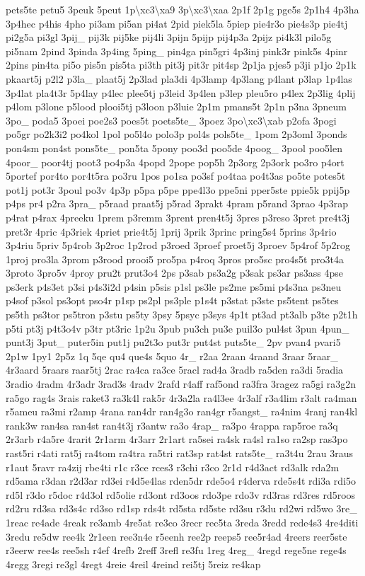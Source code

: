 {pets5te petu5 3peuk 5peut 1p\textbackslash{}xc3\textbackslash{}xa9 3p\textbackslash{}xc3\textbackslash{}xaa 2p1f 2p1g pge5s 2p1h4 4p3ha 3p4hec p4his 4pho pi3am pi5an pi4at 2pid piek5la 5piep pie4r3o pie4s3p pie4tj pi2g5a pi3gl 3pij\-\_\- pij3k pij5ke pij4li 3pijn 5pijp pij4p3a 2pijz pi4k3l pilo5g pi5nam 2pind 3pinda 3p4ing 5ping\-\_\- pin4ga pin5gri 4p3inj pink3r pink5s 4pinr 2pins pin4ta pi5o pis5n pis5ta pi3th pit3j pit3r pit4sp 2p1ja pjes5 p3ji p1jo 2p1k pkaart5j p2l2 p3la\-\_\- plaat5j 2p3lad pla3di 4p3lamp 4p3lang p4lant p3lap 1p4las 3p4lat pla4t3r 5p4lay p4lec plee5tj p3leid 3p4len p3lep pleu5ro p4lex 2p3lig 4plij p4lom p3lone p5lood plooi5tj p3loon p3luie 2p1m pmans5t 2p1n p3na 3pneum 3po\-\_\- poda5 3poei poe2s3 poes5t poets5te\-\_\- 3poez 3po\textbackslash{}xc3\textbackslash{}xab p2ofa 3pogi po5gr po2k3i2 po4kol 1pol po5l4o polo3p pol4s pols5te\-\_\- 1pom 2p3oml 3ponds pon4sm pon4st pons5te\-\_\- pon5ta 5pony poo3d poo5de 4poog\-\_\- 3pool poo5len 4poor\-\_\- poor4tj poot3 po4p3a 4popd 2pope pop5h 2p3org 2p3ork po3ro p4ort 5portef por4to por4t5ra po3ru 1pos po1sa po3sf po4taa po4t3as po5te potes5t pot1j pot3r 3poul po3v 4p3p p5pa p5pe ppe4l3o ppe5ni pper5ste ppie5k ppij5p p4ps pr4 p2ra 3pra\-\_\- p5raad praat5j p5rad 3prakt 4pram p5rand 3prao 4p3rap p4rat p4rax 4preeku 1prem p3remm 3prent pren4t5j 3pres p3reso 3pret pre4t3j pret3r 4pric 4p3riek 4priet prie4t5j 1prij 3prik 3princ pring5s4 5prins 3p4rio 3p4riu 5priv 5p4rob 3p2roc 1p2rod p3roed 3proef proet5j 3proev 5p4rof 5p2rog 1proj pro3la 3prom p3rood prooi5 pro5pa p4roq 3pros pro5sc pro4s5t pro3t4a 3proto 3pro5v 4proy pru2t prut3o4 2ps p3sab ps3a2g p3sak ps3ar ps3ass 4pse ps3erk p4s3et p3si p4s3i2d p4sin p5sis p1sl ps3le ps2me ps5mi p4s3na ps3neu p4sof p3sol ps3opt pso4r p1sp ps2pl ps3ple p1s4t p3stat p3ste ps5tent ps5tes ps5th ps3tor ps5tron p3stu ps5ty 3psy 5psyc p3sys 4p1t pt3ad pt3alb p3te p2t1h p5ti pt3j p4t3o4v p3tr pt3ric 1p2u 3pub pu3ch pu3e puil3o pul4st 3pun 4pun\-\_\- punt3j 3put\-\_\- puter5in put1j pu2t3o put3r put4st puts5te\-\_\- 2pv pvan4 pvari5 2p1w 1py1 2p5z 1q 5qe qu4 que4s 5quo 4r\-\_\- r2aa 2raan 4raand 3raar 5raar\-\_\- 4r3aard 5raars raar5tj 2rac ra4ca ra3ce 5racl rad4a 3radb ra5den ra3di 5radia 3radio 4radm 4r3adr 3rad3s 4radv 2rafd r4aff raf5ond ra3fra 3ragez ra5gi ra3g2n ra5go rag4s 3rais raket3 ra3k4l rak5r 4r3a2la ra4l3ee 4r3alf r3a4lim r3alt ra4man r5ameu ra3mi r2amp 4rana ran4dr ran4g3o ran4gr r5angst\-\_\- ra4nim 4ranj ran4kl rank3w ran4sa ran4st ran4t3j r3antw ra3o 4rap\-\_\- ra3po 4rappa rap5roe ra3q 2r3arb r4a5re 4rarit 2r1arm 4r3arr 2r1art ra5sei ra4sk ra4sl ra1so ra2sp ras3po rast5ri r4ati rat5j ra4tom ra4tra ra5tri rat3sp rat4st rats5te\-\_\- ra3t4u 2rau 3raus r1aut 5ravr ra4zij rbe4ti r1c r3ce rces3 r3chi r3co 2r1d r4d3act rd3alk rda2m rd5ama r3dan r2d3ar rd3ei r4d5e4las rden5dr rde5o4 r4derva rde5s4t rdi3a rdi5o rd5l r3do r5doc r4d3ol rd5olie rd3ont rd3oos rdo3pe rdo3v rd3ras rd3res rd5roos rd2ru rd3sa rd3s4c rd3so rd1sp rds4t rd5sta rd5ste rd3su r3du rd2wi rd5wo 3re\-\_\- 1reac re4ade 4reak re3amb 4re5at re3co 3recr rec5ta 3reda 3redd rede4s3 4re4diti 3redu re5dw ree4k 2r1een ree3n4e r5eenh ree2p reeps5 ree5r4ad 4reers reer5ste r3eerw ree4s ree5sh r4ef 4refb 2reff 3refl re3fu 1reg 4reg\-\_\- 4regd rege5ne rege4s 4regg 3regi re3gl 4regt 4reie 4reil 4reind rei5tj 5reiz re4kap }
